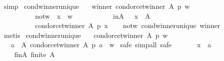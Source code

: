 \begin{isabellebody}
\ simp\isanewline
{}\isamarkupfalse%
%
\endisatagproof
{\isafoldproof}%
%
\isadelimproof
\isanewline
%
\endisadelimproof
\isanewline
{}\isamarkupfalse%
\ cond{\isacharunderscore}{\kern0pt}winner{\isacharunderscore}{\kern0pt}unique{}{\isacharcolon}{\kern0pt}\isanewline
\ \ \ winner{\isacharcolon}{\kern0pt}\ {\isachardoublequoteopen}condorcet{\isacharunderscore}{\kern0pt}winner\ A\ p\ w{\isachardoublequoteclose}\ \isanewline
\ \ \ \ \ \ \ \ \ \ not{\isacharunderscore}{\kern0pt}w{\isacharcolon}{\kern0pt}\ \ {\isachardoublequoteopen}x\ {\isasymnoteq}\ w{\isachardoublequoteclose}\ \isanewline
\ \ \ \ \ \ \ \ \ \ in{\isacharunderscore}{\kern0pt}A{\isacharcolon}{\kern0pt}\ \ \ {\isachardoublequoteopen}x\ {\isasymin}\ A{\isachardoublequoteclose}\isanewline
\ \ \ \ \ \ \ \ \ {\isachardoublequoteopen}{\isasymnot}\ condorcet{\isacharunderscore}{\kern0pt}winner\ A\ p\ x{\isachardoublequoteclose}\isanewline
%
\isadelimproof
\ \ %
\endisadelimproof
%
\isatagproof
{}\isamarkupfalse%
\ not{\isacharunderscore}{\kern0pt}w\ cond{\isacharunderscore}{\kern0pt}winner{\isacharunderscore}{\kern0pt}unique\ winner\isanewline
\ \ \isamarkupfalse%
\ metis%
\endisatagproof
{\isafoldproof}%
%
\isadelimproof
\isanewline
%
\endisadelimproof
\isanewline
{}\isamarkupfalse%
\ cond{\isacharunderscore}{\kern0pt}winner{\isacharunderscore}{\kern0pt}unique{}{\isacharcolon}{\kern0pt}\isanewline
\ \ \ {\isachardoublequoteopen}condorcet{\isacharunderscore}{\kern0pt}winner\ A\ p\ w{\isachardoublequoteclose}\isanewline
\ \ \ {\isachardoublequoteopen}{\isacharbraceleft}{\kern0pt}a\ {\isasymin}\ A{\isachardot}{\kern0pt}\ condorcet{\isacharunderscore}{\kern0pt}winner\ A\ p\ a{\isacharbraceright}{\kern0pt}\ {\isacharequal}{\kern0pt}\ {\isacharbraceleft}{\kern0pt}w{\isacharbraceright}{\kern0pt}{\isachardoublequoteclose}\isanewline
%
\isadelimproof
%
\endisadelimproof
%
\isatagproof
{}\isamarkupfalse%
\ {\isacharparenleft}{\kern0pt}safe{\isacharcomma}{\kern0pt}\ simp{\isacharunderscore}{\kern0pt}all{\isacharcomma}{\kern0pt}\ safe{\isacharparenright}{\kern0pt}\isanewline
\ \ \isamarkupfalse%
\isanewline
\ \ \ \ x\ {\isacharcolon}{\kern0pt}{\isacharcolon}{\kern0pt}\ {\isachardoublequoteopen}{\isacharprime}{\kern0pt}a{\isachardoublequoteclose}\isanewline
\ \ \isamarkupfalse%
\isanewline
\ \ \ \ fin{\isacharunderscore}{\kern0pt}A{\isacharcolon}{\kern0pt}\ {\isachardoublequoteopen}finite\ A{\isachardoublequoteclose}\ \isanewline

\end{isabellebody}
